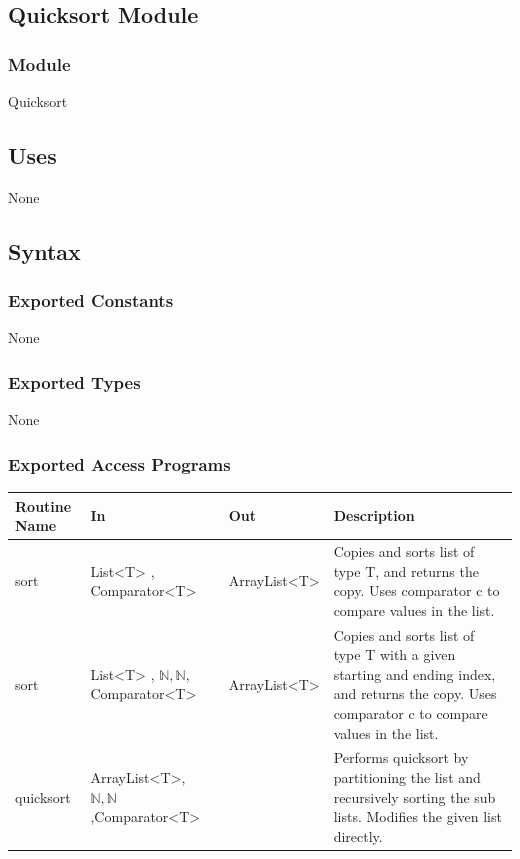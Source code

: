 \documentclass[12pt]{article}
\begin{document}
                \subsection* {Quicksort Module}
                
                \subsubsection*{Module}
                
                Quicksort
                
                \subsection* {Uses}
                
                None
                
                \subsection* {Syntax}
                
                \subsubsection* {Exported Constants}
                None
                \subsubsection* {Exported Types}
                None
                \subsubsection* {Exported Access Programs}
                \begin{tabular}{| l | l | l | p{5cm} |}
                    \hline
                    \textbf{Routine Name} & \textbf{In} & \textbf{Out} & \textbf{Description}\\
                    \hline
                     sort            & List<T> , Comparator<T> & ArrayList<T> & Copies and sorts list of type T, and returns the copy. Uses comparator c
                     to compare values in the list. \\
                    \hline
                     sort            & List<T> , $\mathbb{N}, \mathbb{N}$, Comparator<T>    &ArrayList<T> & Copies and sorts list of type T with a given starting and ending index, and returns the copy. Uses comparator c
                     to compare values in the list. \\
                    \hline
                     quicksort       &ArrayList<T>, $\mathbb{N}, \mathbb{N}$,Comparator<T> &       ~  & Performs quicksort by partitioning the list and recursively sorting the sub lists. Modifies the given list directly.\\
                    \hline
                \end{tabular}
                    
\end{document}

